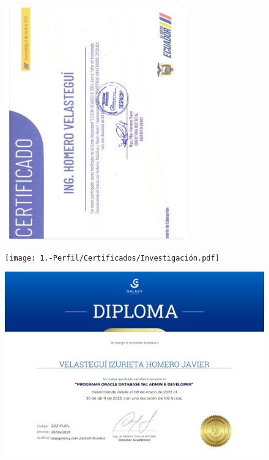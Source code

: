 {\begin{figure}[ht]
    \setlength{\parindent}{-10pt}
    \includegraphics[width=0.7\textwidth, angle=-90]{1.-Perfil/Certificados/Velasco.pdf}
\end{figure}

\begin{figure}[ht]
    \setlength{\parindent}{-20pt}
    \texttt{[image: 1.-Perfil/Certificados/Investigación.pdf]}
\end{figure}

\begin{figure}[ht]
    \setlength{\parindent}{-20pt}
    \includegraphics[width=\textwidth]{1.-Perfil/Certificados/Oracle.pdf}
\end{figure}


}
